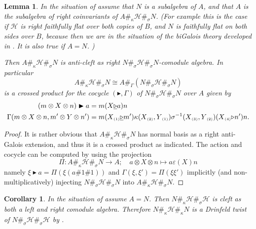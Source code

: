 \documentclass[a4paper,reqno]{amsart}
\numberwithin{equation}{section}
\theoremstyle{plain}
\newtheorem{lem}[thm]{Lemma}
\newtheorem{cor}[thm]{Corollary}
\theoremstyle{remark}
\numberwithin{equation}{section}
\newcommand\inv{^{-1}}
\newcommand{\ot}{\otimes}
\renewcommand{\o}{{}_{\scriptscriptstyle{(1)}}}
\renewcommand{\t}{{}_{\scriptscriptstyle{(2)}}}
\renewcommand{\th}{{}_{\scriptscriptstyle{(3)}}}
\newcommand{\fo}{{}_{\scriptscriptstyle{(4)}}}
\newcommand{\la}{{\triangleright}}
\newcommand{\CH}{\mathcal{H}}
\begin{document}
\begin{lem}\label{one side twisted CM}
    In the situation of  assume that $N$ is a subalgebra of $A$, and that $A$ is the subalgebra of right coinvariants of $A\#_\kappa\CH\#_\sigma N$.  (For example this is the case if $\CH$ is right faithfully flat  over both copies of $B$, and $N$ is faithfully flat on both sides over $B$, because then we are in the situation of the biGalois theory developed in \cite{HS25}. It is also true if $A=N$. )
    
     Then $A\#_\kappa \CH\#_\sigma N$ is anti-cleft as right $N\#_\sigma\CH\#_\sigma N$-comodule algebra. In particular
    \[A\#_\kappa\CH\#_\sigma N\cong A\#_\Gamma(N\#_\sigma\CH\#_\sigma N)\]
    is a crossed product for the cocycle $(\blacktriangleright,\Gamma)$ of $N\#_\sigma\CH\#_\sigma N$ over $A$ given by
    \begin{align*}
        (m\ot X\ot n)\blacktriangleright a&=m(X\laa a)n\\
        \Gamma(m\ot X\ot n,m'\ot Y\ot n')&=m(X\o\laa m')\kappa(X\t,Y\o)\sigma\inv(X\th,Y\t)(X\fo\la n')n.
    \end{align*}    
\end{lem}
\begin{proof}
    It is rather obvious that $A\#_\kappa\CH\#_\sigma N$ has normal basis as a right anti-Galois extension, and thus it is a crossed product as indicated. The action and cocycle can be computed by using the projection 
    \[\Pi\colon A\#_\kappa\CH\#_\sigma N\to A;\quad a\ot X\ot n\mapsto a\varepsilon(X)n\]
    namely $\xi\blacktriangleright a=\Pi(\xi(a\# 1\# 1))$ and $\Gamma(\xi,\xi')=\Pi(\xi\xi')$ implicitly (and non-multiplicatively) injecting $N\#_\sigma\CH\#_{\sigma}N$ into $A\#_\kappa\CH\#_\sigma N$.
    \end{proof}
\begin{cor}
    In the situation of  assume $A=N$. Then $N\#_\kappa\CH\#_\sigma\CH$ is cleft as both a left and right comodule algebra. Therefore $N\#_\kappa\CH\#_\kappa N$ is a Drinfeld twist of $N\#_\sigma\CH\#_\sigma\CH$ by .
\end{cor}
\end{document}
